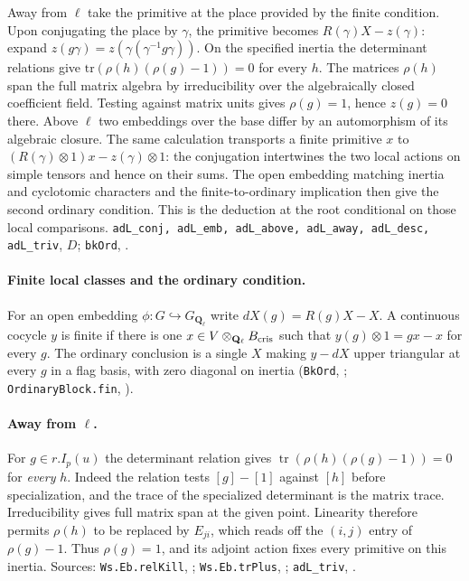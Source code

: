 Away from $\ell$ take the primitive at the place provided by the finite
condition. Upon conjugating the place by $\gamma$, the primitive becomes
$R(\gamma)X-z(\gamma)$: expand $z(g\gamma)=z(\gamma(\gamma^{-1}g\gamma))$.
On the specified inertia the determinant relations give
$\mathrm{tr}(\rho(h)(\rho(g)-1))=0$ for every $h$. The matrices
$\rho(h)$ span the full matrix algebra by irreducibility over the
algebraically closed coefficient field. Testing against matrix units gives
$\rho(g)=1$, hence $z(g)=0$ there. Above $\ell$ two embeddings over the
base differ by an automorphism of its algebraic closure. The same
calculation transports a finite primitive $x$ to
$(R(\gamma)\otimes1)x-z(\gamma)\otimes1$: the conjugation intertwines
the two local actions on simple tensors and hence on their sums.
The open embedding matching inertia and cyclotomic characters and the
finite-to-ordinary implication then give the second ordinary condition.
This is the deduction at the root conditional on those local comparisons.
\nolinkurl{adL_conj, adL_emb, adL_above, adL_away, adL_desc, adL_triv},
$D$;
\nolinkurl{bkOrd}, .

\paragraph{Finite local classes and the ordinary condition.}

For an open embedding $\phi:G\hookrightarrow G_{\mathbf Q_\ell}$ write
$dX(g)=R(g)X-X$. A continuous cocycle $y$ is finite if there is one
$x\in V\otimes_{\mathbf Q_\ell}B_{\rm cris}$ such that
$y(g)\otimes1=gx-x$ for every $g$. The ordinary conclusion is a single
$X$ making $y-dX$ upper triangular at every $g$ in a flag basis, with
zero diagonal on inertia (\nolinkurl{BkOrd}, ;
\nolinkurl{OrdinaryBlock.fin}, ).

\paragraph{Away from $\ell$.}
For $g\in r.I_p(u)$ the determinant relation gives
$\operatorname{tr}(\rho(h)(\rho(g)-1))=0$ for \emph{every} $h$.
Indeed the relation tests $[g]-[1]$ against $[h]$ before specialization,
and the trace of the specialized determinant is the matrix trace.
Irreducibility gives full matrix span at the given point. Linearity
therefore permits $\rho(h)$ to be replaced by $E_{ji}$, which reads
off the $(i,j)$ entry of $\rho(g)-1$. Thus $\rho(g)=1$, and its
adjoint action fixes every primitive on this inertia. Sources:
\nolinkurl{Ws.Eb.relKill}, ;
\nolinkurl{Ws.Eb.trPlus}, ;
\nolinkurl{adL_triv}, .

